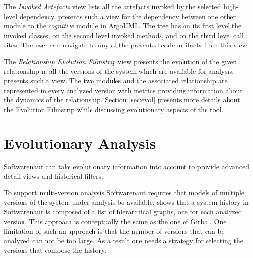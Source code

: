 \documentclass[preprint,12pt]{elsarticle}
\begin{document}
\begin{description}

\item The {\em Invoked Artefacts} view lists all the artefacts invoked by the selected high-level dependency.  presents such a view for the dependency between one other module to the {\em cognitive} module in ArgoUML. The tree has on its first level the invoked classes, on the second level invoked methods, and on the third level call sites. The user can navigate to any of the presented code artifacts from this view.

\item The {\em Relationship Evolution Filmstrip} view presents the evolution of the given relationship in all the versions of the system which are available for analysis.  presents such a view. The two modules and the associated relationship are represented in every analyzed version with metrics providing information about the dynamics of the relationship. Section \ref{sec:evol} presents more details about the Evolution Filmstrip while discussing evolutionary aspects of the tool.

\end{description}




\section {Evolutionary Analysis} 

Softwarenaut can take evolutionary information into account to provide advanced detail views and historical filters.

To support multi-version analysis Softwarenaut requires that models of multiple versions of the system under analysis be available.  shows that a system history in Softwarenaut is composed of a list of hierarchical graphs, one for each analyzed version. This approach is conceptually the same as the one of G{\^i}rba \cite{girba-thesis}. One limitation of such an approach is that the number of versions that can be analyzed can not be too large. As a result one needs a strategy for selecting the versions that compose the history.
\end{document}
